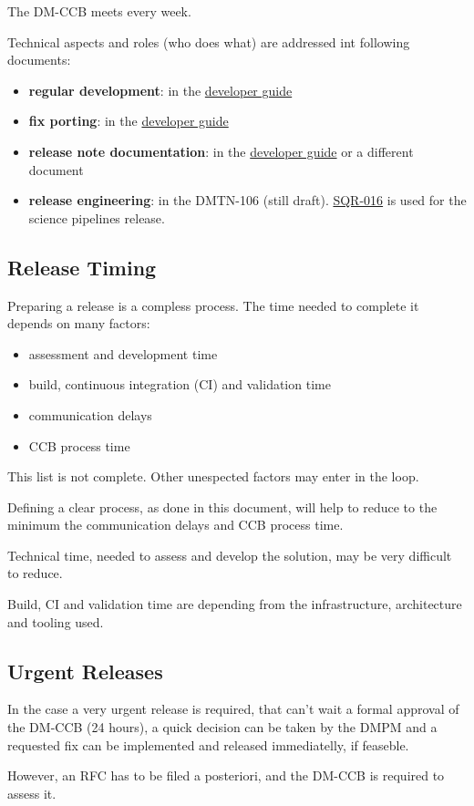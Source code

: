 The DM-CCB meets every week.

Technical aspects and roles (who does what) are addressed int following documents:

\begin{itemize}
\item {\bf regular development}: in the \href{https://developer.lsst.io/}{developer guide}
\item {\bf fix porting}: in the \href{https://developer.lsst.io/}{developer guide}
\item {\bf release note documentation}: in the \href{https://developer.lsst.io/}{developer guide} or a different document
\item {\bf release engineering}: in the DMTN-106 (still draft). \href{https://sqr-016.lsst.io/}{SQR-016} is used for the science pipelines release.
\end{itemize}


\subsection{Release Timing}

Preparing a release is a compless process.
The time needed to complete it depends on many factors:

\begin{itemize}
\item assessment and development time
\item build, continuous integration (CI) and validation time
\item communication delays
\item CCB process time
\end{itemize}

This list is not complete. Other unespected factors may enter in the loop.

Defining a clear process, as done in this document, will help to reduce to the minimum the communication delays and CCB process time.

Technical time, needed to assess and develop the solution, may be very difficult to reduce.

Build, CI and validation time are depending from the infrastructure, architecture and tooling used. 


\subsection{Urgent Releases}

In the case a very urgent release is required, that can't wait a formal approval of the DM-CCB (24 hours), 
a quick decision can be taken by the DMPM and a requested fix can be implemented and released immediatelly, if feaseble.

However, an RFC has to be filed a posteriori, and the DM-CCB is required to assess it.

